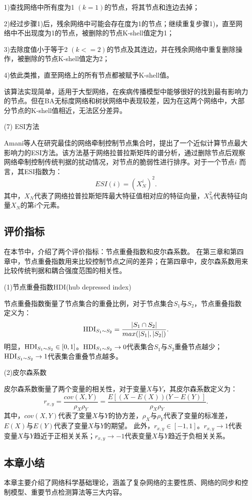 1)查找网络中所有度为1 $(k = 1) $的节点，将其节点和连边去掉；

2)经过步骤1)后，残余网络中可能会存在度为1的节点；继续重复步骤1)，直至网络中不出现度为1的节点，被删除的节点K-shell值定为1；

3)去除度值小于等于2 $ (k<=2) $的节点及其连边，并在残余网络中重复删除操作，被删除的节点K-shell值定为2；

4)依此类推，直至网络上的所有节点都被赋予K-shell值。

该算法实现简单，适用于大型网络，在疾病传播模型中能够很好的找到最有影响力的节点。但在BA无标度网络和树状网络中表现较差，因为在这两个网络中，大部分节点的K-shell值相近，无法区分差异。

(7) ESI方法 \cite{Amani2017}

Amani等人在研究最佳的网络牵制控制节点集合时，提出了一个近似计算节点最大影响力的ESI方法。该方法基于网络拉普拉斯矩阵的谱分析，通过删除节点后观察网络牵制控制传统判据的扰动情况，对节点的脆弱性进行排序。对于一个节点$ i $ 而言，其ESI指数为：
\begin{equation}
ESI(i) = (X_N^i)^2.
\end{equation}
其中，$ X_N $代表了网络拉普拉斯矩阵最大特征值相对应的特征向量，$ X_N^2 $代表特征向量$ X_N $的第$ i $个元素。


\subsection{评价指标}
在本节中，介绍了两个评价指标：节点重叠指数和皮尔森系数。
在第三章和第四章中，节点重叠指数用来比较控制节点之间的差异；在第四章中，皮尔森系数用来比较传统判据和耦合强度范围的相关性。

(1)节点重叠指数HDI(hub depressed index)\cite{Lue2011}

节点重叠指数衡量了节点集合的重叠比例，对于节点集合$ S_1 $与$ S_2 $，节点重叠指数定义为：
\begin{equation}
{\rm HDI}_{S_1\sim S_2} = \frac{|S_1 \cap S_2|}{max(|S_1|,|S_2|)}.
\end{equation}
明显，$ {\rm HDI}_{S_1\sim S_2}\in [0,1] $。$ {\rm HDI}_{S_1 \sim S_2}\rightarrow 0 $代表集合$ S_1 $与$ S_2 $重叠节点越少；$ {\rm HDI}_{S_1\sim S_2}\rightarrow 1 $代表集合重叠节点越多。

(2)皮尔森系数 \cite{LeeRodgers1988}

皮尔森系数衡量了两个变量的相关性，对于变量$ X $与$ Y $，其皮尔森系数定义为：
\begin{equation}
r_{x,y} = \frac{cov(X,Y)}{\rho_X \rho_Y} = \frac{E[(X-E(X))(Y-E(Y)]}{\rho_X \rho_Y}.
\end{equation}
其中，$ cov(X,Y) $代表了变量$ X $与$ Y $的协方差，$ \rho_X $与$ \rho_Y $代表了变量的标准差，$ E(X) $与$ E(Y) $代表了变量$ X $与$ Y $的期望。
此外，$ r_{x,y}\in[-1,1] $。$ r_{x,y}\rightarrow1 $代表变量$ X $与$ Y $趋近于正相关关系；$ r_{x,y}\rightarrow-1 $代表变量$ X $与$ Y $趋近于负相关关系。


\subsection{本章小结}

本章主要介绍了网络科学基础理论，涵盖了复杂网络的主要性质、网络的同步和控制模型、重要节点检测算法等三大内容。


\clearpage
